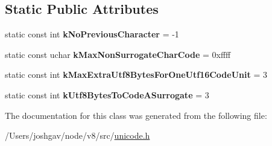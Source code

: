 \subsection*{Static Public Attributes}
\begin{DoxyCompactItemize}
\item 
static const int {\bfseries k\+No\+Previous\+Character} = -\/1\hypertarget{classunibrow_1_1_utf16_a1160051ffd27a644ec813172985b3002}{}\label{classunibrow_1_1_utf16_a1160051ffd27a644ec813172985b3002}

\item 
static const uchar {\bfseries k\+Max\+Non\+Surrogate\+Char\+Code} = 0xffff\hypertarget{classunibrow_1_1_utf16_a621e7db0a6d40f06c69c7041f48a5591}{}\label{classunibrow_1_1_utf16_a621e7db0a6d40f06c69c7041f48a5591}

\item 
static const int {\bfseries k\+Max\+Extra\+Utf8\+Bytes\+For\+One\+Utf16\+Code\+Unit} = 3\hypertarget{classunibrow_1_1_utf16_a74bc74e44596d0b574d843e6c3bf7eb8}{}\label{classunibrow_1_1_utf16_a74bc74e44596d0b574d843e6c3bf7eb8}

\item 
static const int {\bfseries k\+Utf8\+Bytes\+To\+Code\+A\+Surrogate} = 3\hypertarget{classunibrow_1_1_utf16_aca30a98f189d6b895c08c396761c9495}{}\label{classunibrow_1_1_utf16_aca30a98f189d6b895c08c396761c9495}

\end{DoxyCompactItemize}


The documentation for this class was generated from the following file\+:\begin{DoxyCompactItemize}
\item 
/\+Users/joshgav/node/v8/src/\hyperlink{unicode_8h}{unicode.\+h}\end{DoxyCompactItemize}
